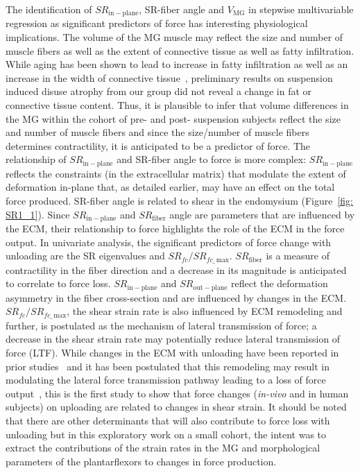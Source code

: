 The identification of $SR_{\mathrm{in-plane}}$, SR-fiber angle and $V_{\mathrm{MG}}$ in stepwise multivariable regression as significant predictors of force has interesting physiological implications. 
The volume of the MG muscle may reflect the size and number of muscle fibers as well as the extent of connective tissue as well as fatty infiltration. 
While aging has been shown to lead to increase in fatty infiltration as well as an increase in the width of connective tissue~\cite{RNS39}, preliminary results on suspension induced disuse atrophy from our group did not reveal a change in fat or connective tissue content.
Thus, it is plausible to infer that volume differences in the MG within the cohort of pre- and post- suspension subjects reflect the size and number of muscle fibers and since the size/number of muscle fibers determines contractility, it is anticipated to be a predictor of force.
The relationship of $SR_{\mathrm{in-plane}}$ and SR-fiber angle to force is more complex: $SR_{\mathrm{in-plane}}$ reflects the constraints (in the extracellular matrix) that modulate the extent of deformation in-plane that, as detailed earlier, may have an effect on the total force produced. 
SR-fiber angle is related to shear in the endomysium (Figure~\ref{fig: SR1_1}).
Since $SR_{\mathrm{in-plane}}$ and $SR_{\mathrm{fiber}}$ angle are parameters that are influenced by the ECM, their relationship to force highlights the role of the ECM in the force output.
In univariate analysis, the significant predictors of force change with unloading are the SR eigenvalues and $SR_{fc}/SR_{fc\_\,\mathrm{max}}$.
 $SR_{\mathrm{fiber}}$ is a measure of contractility in the fiber direction and a decrease in its magnitude is anticipated to correlate to force loss.  $SR_{\mathrm{in-plane}}$ and $SR_{\mathrm{out-plane}}$ reflect the deformation asymmetry in the fiber cross-section and are influenced by changes in the ECM. 
$SR_{fc}/SR_{fc\_\,\mathrm{max}}$, the shear strain rate is also influenced by ECM remodeling and further, is postulated as the mechanism of lateral transmission of force; a decrease in the shear strain rate may potentially reduce lateral transmission of force (LTF). 
While changes in the ECM with unloading have been reported in prior studies~\cite{RNS13} and it has been postulated that this remodeling may result in modulating the lateral force transmission pathway leading to a loss of force output~\cite{RNIRamaswamy}, this is the first study to show that force changes (\textit{in-vivo} and in human subjects) on uploading are related to changes in shear strain. 
It should be noted that there are other determinants that will also contribute to force loss with unloading but in this exploratory work on a small cohort, the intent was to extract the contributions of the strain rates in the MG and morphological parameters of the plantarflexors to changes in force production. 

